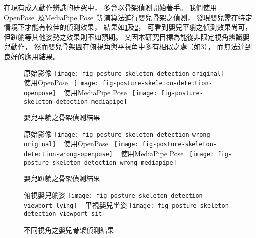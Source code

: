 \documentclass[class=NCU_thesis, crop=false]{standalone}
\begin{document}
在現有成人動作辨識的研究中，
多會以骨架偵測開始著手。
我們使用OpenPose~\cite{cao_openpose_2019}及MediaPipe Pose~\cite{noauthor_pose_nodate}等演算法進行嬰兒骨架之偵測，
發現嬰兒需在特定情境下才能有較佳的偵測效果，
結果如\cref{fig:fig-posture-skeleton-detection}及\cref{fig:fig-posture-skeleton-detection-wrong}，
可看到嬰兒平躺之偵測效果尚可，
但趴躺等其他姿勢之效果則不如預期。
又因本研究目標為能從非限定視角辨識嬰兒動作，
然而嬰兒骨架圖在俯視角與平視角中多有相似之處（如\cref{fig:fig-posture-skeleton-detection-viewport}），
而無法達到良好的應用結果。
\begin{figure}[!hbt]
    \centering
    \subcaptionbox
        {原始影像
        \label{fig:fig-posture-skeleton-detection-original}}
        {\texttt{[image: fig-posture-skeleton-detection-original]}}
    ~
    \subcaptionbox
        {使用OpenPose~\cite{cao_openpose_2019}
        \label{fig:fig-posture-skeleton-detection-openpose}}
        {\texttt{[image: fig-posture-skeleton-detection-openpose]}}
    ~
    \subcaptionbox
        {使用MediaPipe Pose~\cite{noauthor_pose_nodate}
        \label{fig:fig-posture-skeleton-detection-mediapipe}}
        {\texttt{[image: fig-posture-skeleton-detection-mediapipe]}}
    \caption{嬰兒平躺之骨架偵測結果}
    \label{fig:fig-posture-skeleton-detection}
\end{figure}
\begin{figure}[!hbt]
    \centering
    \subcaptionbox
        {原始影像
        \label{fig:fig-posture-skeleton-detection-wrong-original}}
        {\texttt{[image: fig-posture-skeleton-detection-wrong-original]}}
    ~
    \subcaptionbox
        {使用OpenPose~\cite{cao_openpose_2019}
        \label{fig:fig-posture-skeleton-detection-wrong-openpose}}
        {\texttt{[image: fig-posture-skeleton-detection-wrong-openpose]}}
    ~
    \subcaptionbox
        {使用MediaPipe Pose~\cite{noauthor_pose_nodate}
        \label{fig:fig-posture-skeleton-detection-wrong-mediapipe}}
        {\texttt{[image: fig-posture-skeleton-detection-wrong-mediapipe]}}
    \caption{嬰兒趴躺之骨架偵測結果}
    \label{fig:fig-posture-skeleton-detection-wrong}
\end{figure}
\begin{figure}[!hbt]
    \centering
    \subcaptionbox
        {俯視嬰兒躺姿
        \label{fig:fig-posture-skeleton-detection-viewport-lying}}
        {\texttt{[image: fig-posture-skeleton-detection-viewport-lying]}}
    ~
    \subcaptionbox
        {平視嬰兒坐姿
        \label{fig:fig-posture-skeleton-detection-viewport-sit}}
        {\texttt{[image: fig-posture-skeleton-detection-viewport-sit]}}
    \caption{不同視角之嬰兒骨架偵測結果}
    \label{fig:fig-posture-skeleton-detection-viewport}
\end{figure}
\end{document}
